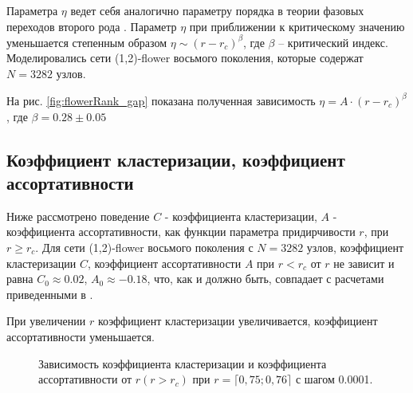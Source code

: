 \documentclass[10pt,aps,pra]{revtex4-1}
\begin{document}
        Параметра $\eta$ ведет себя аналогично параметру порядка в теории фазовых переходов второго рода \cite{Landau}. Параметр $\eta$ при приближении к критическому значению уменьшается степенным образом $\eta \sim (r-r_c)^\beta$, где $\beta$ – критический индекс. 
        Моделировались сети (1,2)-flower восьмого поколения, которые содержат $N=3282$ узлов.

        На рис. \ref{fig:flowerRank_gap} показана полученная зависимость $\eta = A \cdot {(r-r_c)}^\beta$, где $\beta = 0.28 \pm 0.05$

    \subsection{Коэффициент кластеризации, коэффициент ассортативности}

        Ниже рассмотрено поведение $C$ - коэффициента кластеризации, $A$ - коэффициента ассортативности, как функции параметра придирчивости $r$, при $r \geq r_c$. Для сети (1,2)-flower восьмого поколения с $N=3282$ узлов, коэффициент кластеризации $C$, коэффициент ассортативности $A$ при $r<r_c$ от $r$ не зависит и равна $C_0 \approx 0.02$, $A_0 \approx -0.18$, что, как и должно быть, совпадает с расчетами приведенными в \cite{Rozenfeld1,Rozenfeld2}. 

        При увеличении $r$ коэффициент кластеризации увеличивается, коэффициент ассортативности уменьшается.

            \begin{figure}[H]  
                \centering

                \caption{
                    \label{fig:flowerParam}
                    Зависимость коэффициента кластеризации и коэффициента ассортативности от $r (r>r_c)$ при $r=\lceil 0,75; 0,76 \rceil$ с шагом 0.0001.
                }
            \end{figure}
\end{document}
